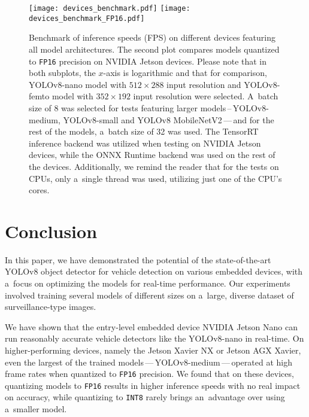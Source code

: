 \begin{figure}[H]
        \centering
        \texttt{[image: devices\_benchmark.pdf]}
        \texttt{[image: devices\_benchmark\_FP16.pdf]}
        \caption{Benchmark of inference speeds (FPS) on different devices
        featuring all model architectures. The second plot compares models
        quantized to \texttt{FP16} precision on NVIDIA Jetson devices. Please
        note that in both subplots, the $x$-axis is logarithmic and that for
        comparison, YOLOv8-nano model with $512 \times 288$ input resolution and
        YOLOv8-femto model with $352 \times 192$ input resolution were selected.
        A~batch size of 8 was selected for tests featuring larger
        models\,--\,YOLOv8-medium, YOLOv8-small and YOLOv8 MobileNetV2\,---\,and
        for the rest of the models, a~batch size of 32 was used. The TensorRT
        inference backend was utilized when testing on NVIDIA Jetson devices,
        while the ONNX Runtime backend was used on the rest of the devices.
        Additionally, we remind the reader that for the tests on CPUs, only
        a~single thread was used, utilizing just one of the CPU's cores.}
        \label{DevicesBenchmark}
\end{figure}




\chapter{Conclusion}

In this paper, we have demonstrated the potential of the state-of-the-art YOLOv8
object detector for vehicle detection on various embedded devices, with a~focus
on optimizing the models for real-time performance. Our experiments involved
training several models of different sizes on a~large, diverse dataset of
surveillance-type images.

We have shown that the entry-level embedded device NVIDIA Jetson Nano can run
reasonably accurate vehicle detectors like the YOLOv8-nano in real-time. On
higher-performing devices, namely the Jetson Xavier NX or Jetson AGX Xavier,
even the largest of the trained models\,---\,YOLOv8-medium\,---\,operated at high
frame rates when quantized to \texttt{FP16} precision. We found that on these
devices, quantizing models to \texttt{FP16} results in higher inference speeds
with no real impact on accuracy, while quantizing to \texttt{INT8} rarely brings
an~advantage over using a~smaller model.

